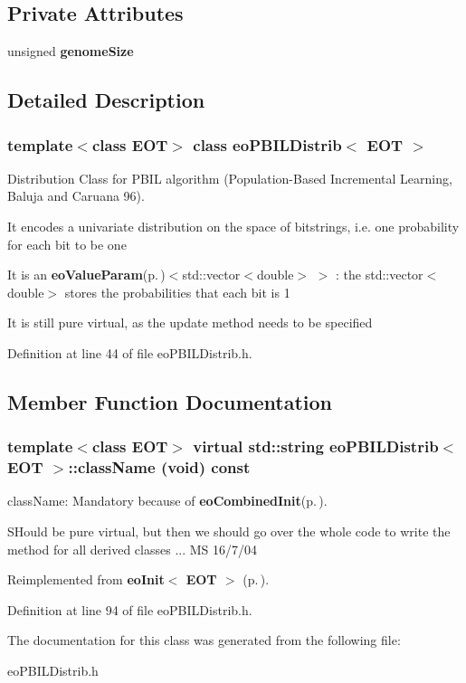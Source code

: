 \subsection*{Private Attributes}
\begin{CompactItemize}
\item 
unsigned {\bf genome\-Size}\label{classeo_p_b_i_l_distrib_r0}

\end{CompactItemize}


\subsection{Detailed Description}
\subsubsection*{template$<$class EOT$>$ class eo\-PBILDistrib$<$ EOT $>$}

Distribution Class for PBIL algorithm (Population-Based Incremental Learning, Baluja and Caruana 96). 

It encodes a univariate distribution on the space of bitstrings, i.e. one probability for each bit to be one

It is an {\bf eo\-Value\-Param}{\rm (p.\,\pageref{classeo_value_param})}$<$std::vector$<$double$>$ $>$ : the std::vector$<$double$>$ stores the probabilities that each bit is 1

It is still pure virtual, as the update method needs to be specified 



Definition at line 44 of file eo\-PBILDistrib.h.

\subsection{Member Function Documentation}
\subsubsection{\setlength{\rightskip}{0pt plus 5cm}template$<$class EOT$>$ virtual std::string {\bf eo\-PBILDistrib}$<$ {\bf EOT} $>$::class\-Name (void) const\hspace{0.3cm}{\tt  [inline, virtual]}}\label{classeo_p_b_i_l_distrib_a6}


class\-Name: Mandatory because of {\bf eo\-Combined\-Init}{\rm (p.\,\pageref{classeo_combined_init})}. 

SHould be pure virtual, but then we should go over the whole code to write the method for all derived classes ... MS 16/7/04 

Reimplemented from {\bf eo\-Init$<$ EOT $>$} {\rm (p.\,\pageref{classeo_init_a0})}.

Definition at line 94 of file eo\-PBILDistrib.h.

The documentation for this class was generated from the following file:\begin{CompactItemize}
\item 
eo\-PBILDistrib.h\end{CompactItemize}
